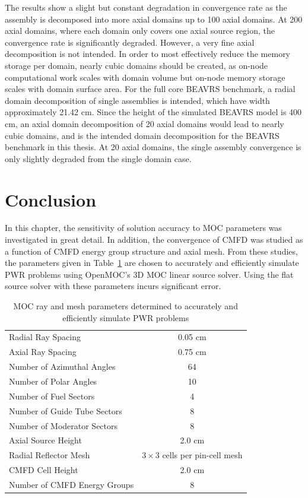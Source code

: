 The results show a slight but constant degradation in convergence rate as the assembly is decomposed into more axial domains up to 100 axial domains. At 200 axial domains, where each domain only covers one axial source region, the convergence rate is significantly degraded. However, a very fine axial decomposition is not intended. In order to most effectively reduce the memory storage per domain, nearly cubic domains should be created, as on-node computational work scales with domain volume but on-node memory storage scales with domain surface area. For the full core BEAVRS benchmark, a radial domain decomposition of single assemblies is intended, which have width approximately 21.42 cm. Since the height of the simulated BEAVRS model is 400 cm, an axial domain decomposition of 20 axial domains would lead to nearly cubic domains, and is the intended domain decomposition for the BEAVRS benchmark in this thesis. At 20 axial domains, the single assembly convergence is only slightly degraded from the single domain case. 


\section{Conclusion}
\label{sec:sensitivity-conclusion}

In this chapter, the sensitivity of solution accuracy to \ac{MOC} parameters was investigated in great detail. In addition, the convergence of \ac{CMFD} was studied as a function of \ac{CMFD} energy group structure and axial mesh. From these studies, the parameters given in Table~\ref{tab:final-params} are chosen to accurately and efficiently simulate \ac{PWR} problems using OpenMOC's 3D \ac{MOC} linear source solver. Using the flat source solver with these parameters incurs significant error.

\begin{table}[ht]
	\centering
	\caption{MOC ray and mesh parameters determined to accurately and efficiently simulate PWR problems}
	\medskip
	\begin{tabular}{lc}
		\hline
		Radial Ray Spacing & 0.05 cm \\
		Axial Ray Spacing & 0.75 cm \\
		Number of Azimuthal Angles & 64 \\
		Number of Polar Angles & 10 \\
		\hline
		Number of Fuel Sectors & 4 \\
		Number of Guide Tube Sectors & 8 \\
		Number of Moderator Sectors & 8 \\
		Axial Source Height & 2.0 cm \\
		Radial Reflector Mesh & $3\times 3$ cells per pin-cell mesh \\
		\hline
		\ac{CMFD} Cell Height & 2.0 cm \\
		Number of \ac{CMFD} Energy Groups & 8 \\
		\hline
	\end{tabular}
	\label{tab:final-params}
\end{table}

